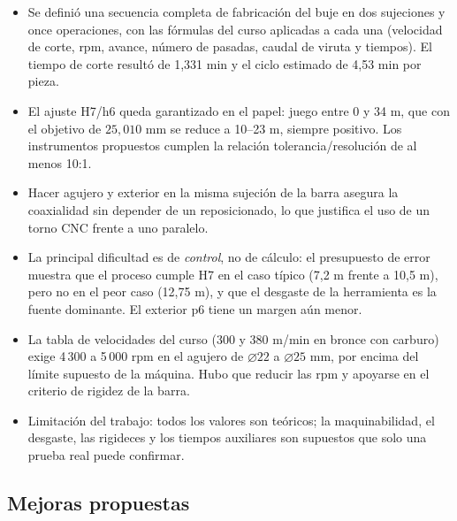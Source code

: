\documentclass[12pt,a4paper]{article}
\begin{document}
\begin{itemize}
	\item Se definió una secuencia completa de fabricación del buje en dos
	      sujeciones y once operaciones, con las fórmulas del curso aplicadas a
	      cada una (velocidad de corte, rpm, avance, número de pasadas, caudal de
	      viruta y tiempos). El tiempo de corte resultó de 1,331 min y el ciclo
	      estimado de 4,53 min por pieza.\\[-10pt]
	\item El ajuste H7/h6 queda garantizado en el papel: juego entre 0 y 34 \textmu m,
	      que con el objetivo de $25{,}010$ mm se reduce a 10--23 \textmu m, siempre
	      positivo. Los instrumentos propuestos cumplen la relación
	      tolerancia/resolución de al menos 10:1.\\[-10pt]
	\item Hacer agujero y exterior en la misma sujeción de la barra asegura la
	      coaxialidad sin depender de un reposicionado, lo que justifica el uso de
	      un torno CNC frente a uno paralelo.\\[-10pt]
	\item La principal dificultad es de \emph{control}, no de cálculo: el
	      presupuesto de error muestra que el proceso cumple H7 en el caso típico
	      (7,2 \textmu m frente a 10,5 \textmu m), pero no en el peor caso
	      (12,75 \textmu m), y que el desgaste de la herramienta es la fuente
	      dominante. El exterior p6 tiene un margen aún menor.\\[-10pt]
	\item La tabla de velocidades del curso (300 y 380 m/min en bronce con
	      carburo) exige 4\,300 a 5\,000 rpm en el agujero de $\varnothing22$ a
	      $\varnothing25$ mm, por encima del límite supuesto de la máquina. Hubo que
	      reducir las rpm y apoyarse en el criterio de rigidez de la barra.\\[-10pt]
	\item Limitación del trabajo: todos los valores son teóricos; la
	      maquinabilidad, el desgaste, las rigideces y los tiempos auxiliares son
	      supuestos que solo una prueba real puede confirmar.
\end{itemize}

\subsection{Mejoras propuestas}
\end{document}
